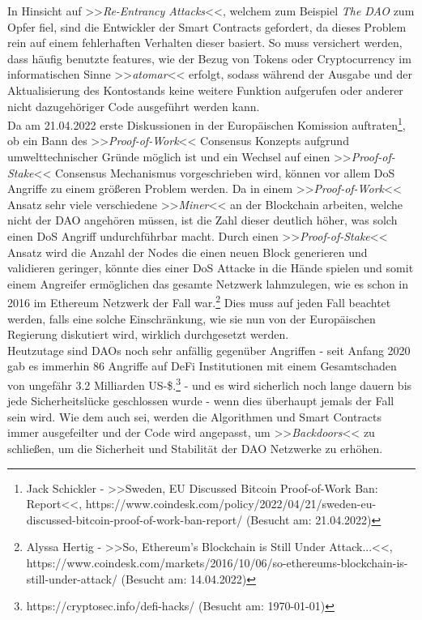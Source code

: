 \documentclass[a4paper,12pt]{report}
\begin{document}
	In Hinsicht auf >>\textit{Re-Entrancy Attacks}<<, welchem zum Beispiel \textit{The DAO} zum Opfer fiel, sind die Entwickler der Smart Contracts gefordert, da dieses Problem rein auf einem fehlerhaften Verhalten dieser basiert. So muss versichert werden, dass häufig benutzte features, wie der Bezug von Tokens oder Cryptocurrency im informatischen Sinne >>\textit{atomar}<< erfolgt, sodass während der Ausgabe und der Aktualisierung des Kontostands keine weitere Funktion aufgerufen oder anderer nicht dazugehöriger Code ausgeführt werden kann. \\
	Da am 21.04.2022 erste Diskussionen in der Europäischen Komission auftraten\footnote{\hspace{0.5em}\begin{minipage}[t]{13cm}Jack Schickler - >>Sweden, EU Discussed Bitcoin Proof-of-Work Ban: Report<<, https://www.coindesk.com/policy/2022/04/21/sweden-eu-discussed-bitcoin-proof-of-work-ban-report/ (Besucht am: 21.04.2022)\end{minipage}}, ob ein Bann des >>\textit{Proof-of-Work}<< Consensus Konzepts aufgrund umwelttechnischer Gründe möglich ist und ein Wechsel auf einen >>\textit{Proof-of-Stake}<< Consensus Mechanismus vorgeschrieben wird, können vor allem DoS Angriffe zu einem größeren Problem werden. Da in einem >>\textit{Proof-of-Work}<< Ansatz sehr viele verschiedene >>\textit{Miner}<< an der Blockchain arbeiten, welche nicht der DAO angehören müssen, ist die Zahl dieser deutlich höher, was solch einen DoS Angriff undurchführbar macht. Durch einen >>\textit{Proof-of-Stake}<< Ansatz wird die Anzahl der Nodes die einen neuen Block generieren und validieren geringer, könnte dies einer DoS Attacke in die Hände spielen und somit einem Angreifer ermöglichen das gesamte Netzwerk lahmzulegen, wie es schon in 2016 im Ethereum Netzwerk der Fall war.\footnote{\hspace{0.5em}\begin{minipage}[t]{13cm}Alyssa Hertig - >>So, Ethereum’s Blockchain is Still Under Attack...<<, https://www.coindesk.com/markets/2016/10/06/so-ethereums-blockchain-is-still-under-attack/ (Besucht am: 14.04.2022)\end{minipage}} Dies muss auf jeden Fall beachtet werden, falls eine solche Einschränkung, wie sie nun von der Europäischen Regierung diskutiert wird, wirklich durchgesetzt werden. \\
	Heutzutage sind DAOs noch sehr anfällig gegenüber Angriffen - seit Anfang 2020 gab es immerhin 86 Angriffe auf DeFi Institutionen mit einem Gesamtschaden von ungefähr 3.2 Milliarden US-\$.\footnote{\hspace{0.5em}https://cryptosec.info/defi-hacks/ (Besucht am: \today)} - und es wird sicherlich noch lange dauern bis jede Sicherheitslücke geschlossen wurde - wenn dies überhaupt jemals der Fall sein wird. Wie dem auch sei, werden die Algorithmen und Smart Contracts immer ausgefeilter und der Code wird angepasst, um >>\textit{Backdoors}<< zu schließen, um die Sicherheit und Stabilität der DAO Netzwerke zu erhöhen. \\
	
\end{document}
